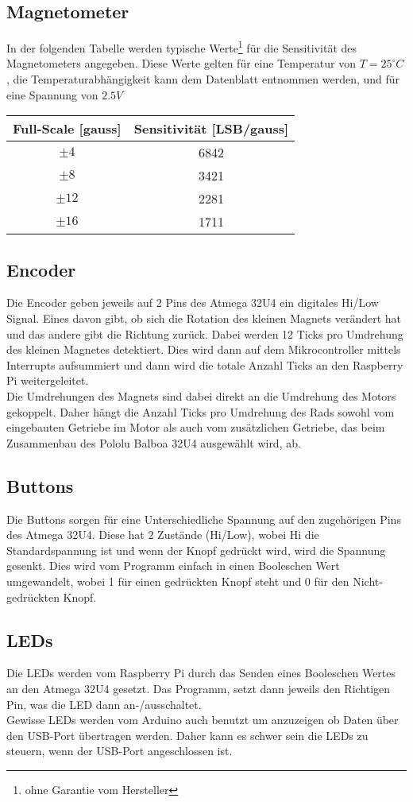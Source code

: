 \documentclass[a4paper, 12pt]{article}
\begin{document}
\subsection*{Magnetometer}In der folgenden Tabelle werden typische Werte\footnote{ohne Garantie vom Hersteller} für die Sensitivität des Magnetometers angegeben.
Diese Werte gelten für eine Temperatur von $T = 25^\circ C$, die Temperaturabhängigkeit kann dem Datenblatt entnommen werden, und für eine Spannung von $2.5 V$
\begin{center}
	\begin{tabular}{c | c}
		Full-Scale [gauss] & Sensitivität [LSB/gauss]\\\hline
		$\pm 4$ & 6842\\
		$\pm 8$ & 3421\\
		$\pm 12$ & 2281\\
		$\pm 16$ & 1711
	\end{tabular}
\end{center}

\subsection*{Encoder}
Die Encoder geben jeweils auf 2 Pins des Atmega 32U4 ein digitales Hi/Low Signal. Eines davon gibt, ob sich die Rotation des kleinen Magnets verändert hat und das andere gibt die Richtung zurück. Dabei werden 12 Ticks pro Umdrehung des kleinen Magnetes detektiert. Dies wird dann auf dem Mikrocontroller mittels Interrupts aufsummiert und dann wird die totale Anzahl Ticks an den Raspberry Pi weitergeleitet.\\
Die Umdrehungen des Magnets sind dabei direkt an die Umdrehung des Motors gekoppelt. Daher hängt die Anzahl Ticks pro Umdrehung des Rads sowohl vom eingebauten Getriebe im Motor als auch vom zusätzlichen Getriebe, das beim Zusammenbau des Pololu Balboa 32U4 ausgewählt wird, ab.

\subsection*{Buttons}
Die Buttons sorgen für eine Unterschiedliche Spannung auf den zugehörigen Pins des Atmega 32U4. Diese hat 2 Zustände (Hi/Low), wobei Hi die Standardspannung ist und wenn der Knopf gedrückt wird, wird die Spannung gesenkt. Dies wird vom Programm einfach in einen Booleschen Wert umgewandelt, wobei 1 für einen gedrückten Knopf steht und 0 für den Nicht-gedrückten Knopf.

\subsection*{LEDs}
Die LEDs werden vom Raspberry Pi durch das Senden eines Booleschen Wertes an den Atmega 32U4 gesetzt. Das Programm, setzt dann jeweils den Richtigen Pin, was die LED dann an-/ausschaltet.\\
Gewisse LEDs werden vom Arduino auch benutzt um anzuzeigen ob Daten über den USB-Port übertragen werden. Daher kann es schwer sein die LEDs zu steuern, wenn der USB-Port angeschlossen ist.
\end{document}
